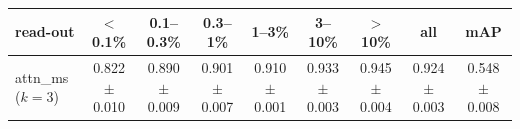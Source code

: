 \begin{tabular}{lcccccccc}
\toprule
read-out & $<$0.1\% & 0.1--0.3\% & 0.3--1\% & 1--3\% & 3--10\% & $>$10\% & all & mAP \\
\midrule
attn\_ms ($k=3$) & 0.822 $\pm$ 0.010 & 0.890 $\pm$ 0.009 & 0.901 $\pm$ 0.007 & 0.910 $\pm$ 0.001 & 0.933 $\pm$ 0.003 & 0.945 $\pm$ 0.004 & 0.924 $\pm$ 0.003 & 0.548 $\pm$ 0.008 \\
\bottomrule
\end{tabular}
